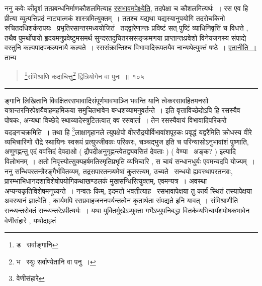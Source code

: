 \documentclass[11pt, openany]{book}
\begin{document}
ननु कवेः कीदृशं तत्प्रबन्धनिर्माणकौशलमित्याह \underline{रसभावमपेक्ष्येति}, तदपेक्षा च कौशलमित्यर्थः~। रस एव हि प्रीत्या व्युत्पत्तिप्रदं नाट्यात्मकं शास्त्रमित्युक्तम्~। ततश्च यद्यथा यद्यस्यानुपयोगि तदरोचकिनो रुचितदधिशर्करापयः \textendash\ प्रभृतिरसान्तरमध्ययोजितं \textendash\ तद्द्वारेणान्तः प्रविष्टं सत् पुष्टिं व्याधिनिवृत्तिं च विधत्ते , तथैव पुमर्थोपायो हृदयमनुप्रवेष्टुमसमर्थ सुन्दरतदुचितरससङ्क्रमणया प्राप्तान्तःप्रवेशो विनेयजनस्य संपाद्ये वस्तुनि कल्पपादपकल्पनायै कल्पते~। रससंक्रान्तिश्च विभावादिरूपतयैव नान्यथेत्युक्तं षष्ठे~। \underline{एतानीति~।} तान्य \textendash

\newpage

\begin{quote}
{\na \renewcommand{\thefootnote}{1}\footnote{ड \textendash\ सर्वाङ्गानि}संमिश्राणि कदाचित्तु\renewcommand{\thefootnote}{2}\footnote{भ \textendash\ स्युः सर्वाण्येतानि वा पनु~।} द्वित्रियोगेन वा पुनः~॥~१०५}
\end{quote}

\hrule

\vspace{2mm}
\noindent
ङ्गानि लिखितानि विवक्षितरसभावादिसंपूर्णभावभाञ्जि भवन्ति यानि त्वेकरसावहितमनसो यत्रान्तरनिरपेक्षयैवाहमहमिकया समुचितभावेन बन्धशय्यामनुवर्तन्ते~। इति वृत्ताविच्छेदोऽपि हि रसस्यैव पोषकः, अन्यथा विच्छेदे स्थाय्यादेस्त्रुटितत्वात् क्व रसवार्ता~। तेन रसस्यैवायं विभावादिपरिकरो यदङ्गचक्रमिति~। तथा हि {\qt \renewcommand{\thefootnote}{*}\footnote{वेणीसंहारे}लाक्षागृहानले} त्युपक्षेपो वीररौद्रयोर्विभावांशपूरकः {\qt \footnotemark{*}प्रवृद्धं यद्वरै}मिति क्रोधस्य वीरे व्यभिचारिणो रौद्रे स्थायिनः स्वरूपं प्रत्युज्जीवकः परिकरः, {\qt \footnotemark{*}चञ्चद्भुज} इति च परिन्यासोऽनुभावांशं पुष्णाति, {\qt \footnotemark{*}अणुगह्णन्तु एदं ववसिदं देवदाओ} ( द्रौपदीअनुगृह्णन्त्वेतद्व्यवसितं देवताः ) ( वेण्या \textendash\ अङ्क? ) इत्यादि विलोभनम्~। अतो निवृत्त्योत्सुक्यहर्षमतिस्मृतिप्रभृति व्यभिचारि , स चायं सन्धानधुर्यः एवमन्यदपि योज्यम्~।\\

ननु सन्धिपरतन्त्रैरङ्गैर्भवितव्यम्, तद्रसपारतन्त्र्यमेषां कुतस्त्यम्, उच्यते \textendash\ सन्धयो ह्यवस्थापरतन्त्राः, प्रारम्भाभिधानदशाविशेषोपयोगिकथाखण्डलकं मुखसन्धिरित्युक्तम्, एवमन्यत्र~। अवस्था अप्यन्यकृतिविशेषमनूच्यन्ते~। नन्वतः किम्, इदमतो भवतीत्याह \textendash\ रसभावापेक्षया तु कार्यं स्थितं तस्यापेक्षया अवस्थानं ज्ञात्वेति , कार्यमपि रसप्रवाहजननपर्यन्तत्वेन कृतार्थता संपद्यते इनि यावत्~। संमिश्राणीति सन्ध्यन्तरोक्तं सन्ध्यन्तरेऽपीत्यर्यः~। यथा युक्तिर्मुखेऽप्युक्ता गर्भेऽप्युपनिबद्धा वितर्कव्यभिचार्यंशपोषकभावेन वेणीसंहारे , यथोदाहृतं
\end{document}
